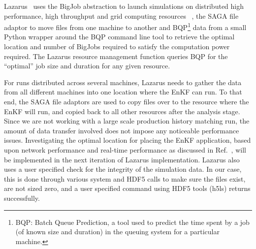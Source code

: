 \documentclass{acm_proc_article-sp}
\newcommand{\jhanote}[1]{ {\textcolor{red} { ***Jha: #1 }}}
\newcommand{\yyenote}[1]{ {\textcolor{blue} { ***yye00: #1 }}}
\newcommand{\jhanote}[1]{}
\newcommand{\yyenote}[1]{}
\begin{document}



Lazarus~\cite{gmac} uses the BigJob abstraction to launch simulations on
distributed high performance, high throughput and grid computing
resources ~\cite{gmac}, the SAGA file adaptor to move files from one
machine to another and BQP\footnote{BQP: Batch Queue Prediction, a tool
used to predict the time spent by a job (of known size and duration)
in the queuing system for a particular machine.} data from a small Python wrapper around the
BQP command line tool to retrieve the optimal location and number of
BigJobs required to satisfy the computation power required. The Lazarus
resource management function queries BQP for the ``optimal'' job size
and duration for any given resource.

For runs distributed across several machines, Lazarus needs to gather
the data from all different machines into one location where the EnKF
can run. To that end, the SAGA file adaptors are used to copy files
over to the resource where the EnKF will run, and copied back to all
other resources after the analysis stage. Since we are not working
with a large scale production history matching run, the amount of data
transfer involved does not impose any noticeable performance
issues. Investigating the optimal location for placing the
EnKF application, based upon network performance and real-time
performance as discussed in Ref.~\cite{escience07}, will be implemented
in the next iteration of Lazarus implementation.  Lazarus also uses
a user specified check for the integrity of the simulation data. In
our case, this is done through various system and HDF5 calls to make
sure the files exist, are not sized zero, and a user specified command
using HDF5 tools (h5ls) returns successfully.
\end{document}
